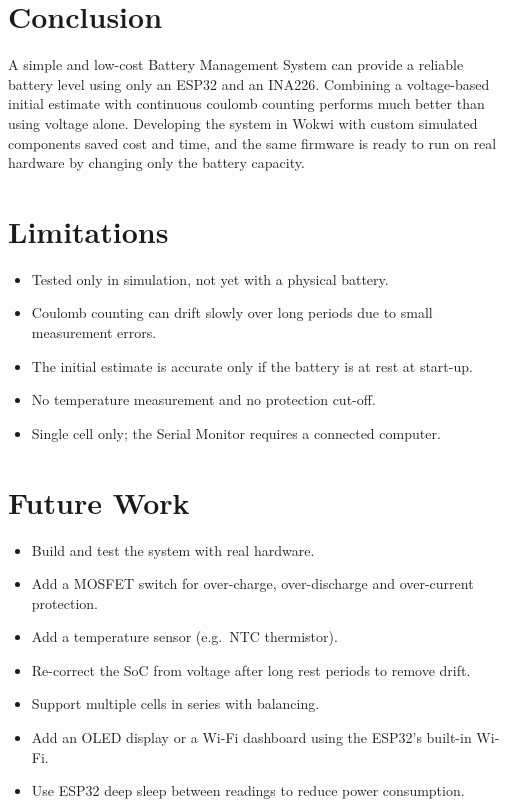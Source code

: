\documentclass[12pt,a4paper,oneside]{report}
\begin{document}
\section{Conclusion}
A simple and low-cost Battery Management System can provide a reliable battery level using only an ESP32 and an INA226. Combining a voltage-based initial estimate with continuous coulomb counting performs much better than using voltage alone. Developing the system in Wokwi with custom simulated components saved cost and time, and the same firmware is ready to run on real hardware by changing only the battery capacity.

\section{Limitations}
\begin{itemize}
  \item Tested only in simulation, not yet with a physical battery.
  \item Coulomb counting can drift slowly over long periods due to small measurement errors.
  \item The initial estimate is accurate only if the battery is at rest at start-up.
  \item No temperature measurement and no protection cut-off.
  \item Single cell only; the Serial Monitor requires a connected computer.
\end{itemize}

\section{Future Work}
\begin{itemize}
  \item Build and test the system with real hardware.
  \item Add a MOSFET switch for over-charge, over-discharge and over-current protection.
  \item Add a temperature sensor (e.g.\ NTC thermistor).
  \item Re-correct the SoC from voltage after long rest periods to remove drift.
  \item Support multiple cells in series with balancing.
  \item Add an OLED display or a Wi-Fi dashboard using the ESP32's built-in Wi-Fi.
  \item Use ESP32 deep sleep between readings to reduce power consumption.
\end{itemize}
\end{document}
